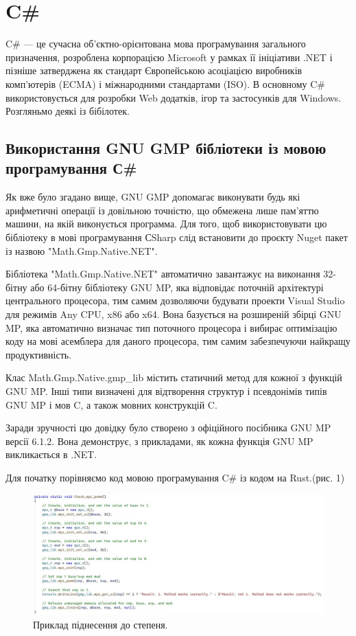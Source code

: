 \section{C\#}

C\# — це сучасна об’єктно-орієнтована мова програмування загального призначення, розроблена корпорацією Microsoft у рамках її ініціативи .NET і пізніше затверджена як стандарт Європейською асоціацією виробників комп’ютерів (ECMA) і міжнародними стандартами (ISO). В основному C\# використовується для розробки Web додатків, ігор та застосунків для Windows. Розгляньмо деякі із бібілотек.

\subsection{Використання GNU GMP бібліотеки із мовою програмування С\#}

Як вже було згадано вище, GNU GMP допомагає виконувати будь які арифметичні операції із довільною точністю, що обмежена лише пам'яттю машини, на якій виконується программа. Для того, щоб використовувати цю бібліотеку в мові програмування СSharp слід встановити до проєкту Nuget пакет із назвою "Math.Gmp.Native.NET".

Бібліотека "Math.Gmp.Native.NET" автоматично завантажує на виконання 32-бітну або 64-бітну бібліотеку GNU MP, яка відповідає поточній архітектурі центрального процесора, тим самим дозволяючи будувати проекти Visual Studio для режимів Any CPU, x86 або x64. Вона базується на розширеній збірці GNU MP, яка автоматично визначає тип поточного процесора і вибирає оптимізацію коду на мові асемблера для даного процесора, тим самим забезпечуючи найкращу продуктивність. 

Клас Math.Gmp.Native.gmp\_lib містить статичний метод для кожної з функцій GNU MP. Інші типи визначені для відтворення структур і псевдонімів типів GNU MP і мов C, а також мовних конструкцій C.

Заради зручності цю довідку було створено з офіційного посібника GNU MP версії 6.1.2. Вона демонструє, з прикладами, як кожна функція GNU MP викликається в .NET.

Для початку порівняємо код мовою програмування C\# із кодом на Rust.(рис. 1)

\begin{figure}[!h]
     \centering
     \includegraphics[scale = 1]{../IMAGES/image_01_c_sharp_lab_01.jpg}
     \caption{Приклад піднесення до степеня.}
     \label{fig:}
\end{figure}

